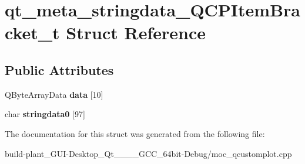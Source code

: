 \hypertarget{structqt__meta__stringdata__QCPItemBracket__t}{}\section{qt\+\_\+meta\+\_\+stringdata\+\_\+\+Q\+C\+P\+Item\+Bracket\+\_\+t Struct Reference}
\label{structqt__meta__stringdata__QCPItemBracket__t}
\subsection*{Public Attributes}
\begin{DoxyCompactItemize}
\item 
\mbox{\label{structqt__meta__stringdata__QCPItemBracket__t_a43e94e3d311baab0f40ef38c9a1869b9}} 
Q\+Byte\+Array\+Data {\bfseries data} \mbox{[}10\mbox{]}
\item 
\mbox{\label{structqt__meta__stringdata__QCPItemBracket__t_a69c4efac85336d82d66b351f29e79864}} 
char {\bfseries stringdata0} \mbox{[}97\mbox{]}
\end{DoxyCompactItemize}


The documentation for this struct was generated from the following file\+:\begin{DoxyCompactItemize}
\item 
build-\/plant\+\_\+\+G\+U\+I-\/\+Desktop\+\_\+\+Qt\+\_\+\_\+\_\+\_\+\+G\+C\+C\+\_\+64bit-\/\+Debug/moc\+\_\+qcustomplot.\+cpp\end{DoxyCompactItemize}

